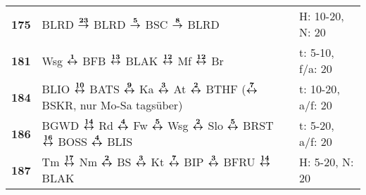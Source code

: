 \begin{minipage}[t]{0.45\textwidth}
\begin{tabular}{>{\bfseries}L{1.2cm}L{9.0cm}L{3.0cm}}
\bus{} 175    & BLRD $\xarre{23}$ BLRD $\xarre{5}$ BSC $\xarre{8}$ BLRD                                                                                                             & H: 10-20, N: 20            \\
\bus{} 181    & Wsg $\xarwe{1}$ BFB $\xarwe{13}$ BLAK $\xarwe{12}$ Mf $\xarwe{12}$ Br                                                                                               & t: 5-10, f/a: 20           \\
\bus{} 184    & BLIO $\xarwe{10}$ BATS $\xarwe{9}$ Ka $\xarwe{3}$ At $\xarwe{2}$ BTHF ($\xarwe{7}$ BSKR, nur Mo-Sa tagsüber)
& t: 10-20, a/f: 20          \\
\bus{} 186    & BGWD $\xarwe{14}$ Rd $\xarwe{4}$ Fw $\xarwe{5}$ Wsg $\xarwe{2}$ Slo $\xarwe{5}$ BRST $\xarwe{16}$ BOSS $\xarwe{4}$ BLIS                                             & t: 5-20, a/f: 20           \\
\bus{} 187    & Tm $\xarwe{17}$ Nm $\xarwe{2}$ BS $\xarwe{3}$ Kt $\xarwe{7}$ BIP $\xarwe{3}$ BFRU $\xarwe{14}$ BLAK                                                                 & H: 5-20, N: 20             \\
\hline
\end{tabular}
\end{minipage}
\begin{minipage}[t]{0.05\textwidth}
\phantom{Tor}
\end{minipage}

